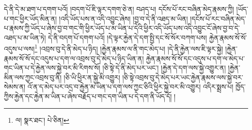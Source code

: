 དེ་ནི་དེ་མ་ཐག་པ་དགག་པའོ། །བདག་པོ་ཇི་ལྟར་དགག་ཅེ་ན། བཤད་པ། དངོས་པོ་རང་བཞིན་མེད་རྣམས་ཀྱི། །ཡོད་པ་གང་ཕྱིར་ཡོད་མིན་ན། །འདི་ཡོད་པས་ན་འདི་འབྱུང་ཞེས། །བྱ་བ་དེ་ནི་འཐད་མ་ཡིན། །དངོས་པོ་རང་བཞིན་མེད་པ་རྣམས་ཀྱི་ཡོད་པ་ཞེས་བྱ་བ་གང་གི་ཕྱིར་ཡོད་པ་མ་ཡིན་པ་དེའི་ཕྱིར་འདི་ཡོད་པས་འདི་འབྱུང་ངོ་ཞེས་བྱ་བ་དེ་འཐད་པ་མ་ཡིན་ཏེ། དེ་ནི་བདག་པོ་དགག་པའོ། །དེ་ལྟར་རྐྱེན་དེ་དག་སྤྱི་དང་སོ་སོར་བཀག་པས། རྐྱེན་རྣམས་སོ་སོ་འདུས་པ་ལས།\footnote{ལ།  སྣར་ཐང་།  པེ་ཅིན། } །འབྲས་བུ་དེ་ནི་མེད་པ་ཉིད། །རྐྱེན་རྣམས་ལ་ནི་གང་མེད་པ། །དེ་ནི་རྐྱེན་ལས་ཇི་ལྟར་སྐྱེ། །རྐྱེན་རྣམས་སོ་སོ་དང་འདུས་པ་དག་ལ་འབྲས་བུ་དེ་མེད་པ་ཉིད་ཡིན་ན། རྐྱེན་རྣམས་སོ་སོ་དང་འདུས་པ་དག་ལ་མེད་པ་གང་ཡིན་པ་དེ་རྐྱེན་ལས་སྐྱེ་བར་མི་རིགས་སོ། །ཅི་སྟེ་དེ་ནི་མེད་པར་ཡང་། །རྐྱེན་དེ་དག་ལས་སྐྱེ་འགྱུར་ན། །རྐྱེན་མིན་ལས་ཀྱང་འབྲས་བུ་ནི། །ཅི་ཡི་ཕྱིར་ན་སྐྱེ་མི་འགྱུར། །ཅི་སྟེ་འབྲས་བུ་དེ་མེད་པར་ཡང་རྐྱེན་རྣམས་ལས་སྐྱེ་བར་སེམས་ན། འོ་ན་ད་མེད་པར་འདྲ་བ་རྐྱེན་མ་ཡིན་པ་དག་ལས་ཀྱང་ཅིའི་ཕྱིར་སྐྱེ་བར་མི་འགྱུར། འདིར་སྨྲས་པ། ཁྱོད་ཀྱིས་རྐྱེན་དང་རྐྱེན་མ་ཡིན་པ་ཞེས་བརྗོད་པ་གང་དག་ཡིན་པ་དེ་དག་ནི་ཡོད་དོ། །
